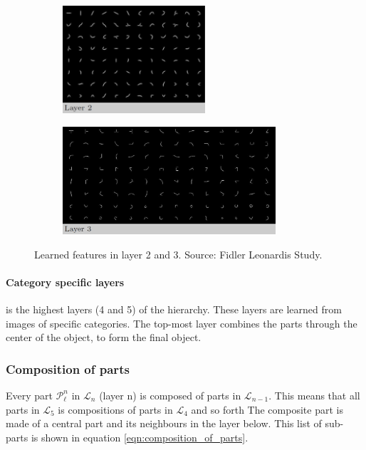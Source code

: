 \begin{figure}[h!] %
	\centering
\begin{subfigure}[b]{0.3\textwidth}
	\includegraphics[height=4cm]{graphics/layer2_features}
\end{subfigure}
\hspace{1cm}
\begin{subfigure}[b]{0.3\textwidth}
	\includegraphics[height=4cm]{graphics/layer3_features}
\end{subfigure}
\caption{Learned features in layer 2 and 3. Source: Fidler Leonardis Study. }
\label{fig:layer2+3}
\end{figure}

\paragraph*{Category specific layers} is the highest layers (4 and 5) of the hierarchy. These layers are learned from images of specific categories. The top-most layer combines the parts through the center of the object, to form the final object. 


\subsubsection{Composition of parts}
\label{sec:composition-of-parts}
Every part $\mathcal{P}_{\ell}^n$  in $\mathcal{L}_n$ (layer n) is composed of parts in $\mathcal{L}_{n-1}$. This means that all parts in $\mathcal{L}_5$  is compositions of parts in $\mathcal{L}_4$  and so forth
The composite part is made of a central part and its neighbours in the layer below. 
This list of sub-parts is shown in equation \ref{eqn:composition_of_parts}. 


